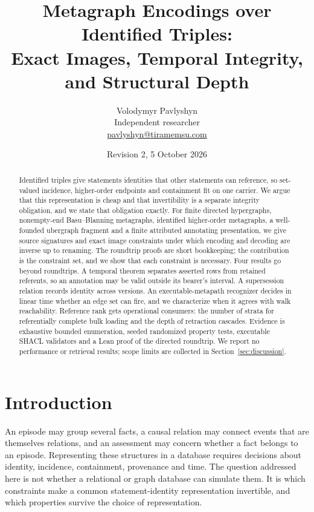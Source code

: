 \documentclass[11pt]{article}
\title{Metagraph Encodings over Identified Triples:\\
Exact Images, Temporal Integrity, and Structural Depth}
\author{Volodymyr Pavlyshyn\\[2pt]\small Independent researcher\\
\small\href{mailto:pavlyshyn@tiramemsu.com}{pavlyshyn@tiramemsu.com}}
\date{Revision 2, 5 October 2026}
\theoremstyle{plain}
\theoremstyle{definition}
\theoremstyle{remark}
\begin{document}
\maketitle
\begin{abstract}
Identified triples give statements identities that other statements can reference,
so set-valued incidence, higher-order endpoints and containment fit on one carrier.
We argue that this representation is cheap and that invertibility is a separate
integrity obligation, and we state that obligation exactly. For finite directed
hypergraphs, nonempty-end Basu--Blanning metagraphs, identified higher-order
metagraphs, a well-founded ubergraph fragment and a finite attributed annotating
presentation, we give source signatures and exact image constraints under which
encoding and decoding are inverse up to renaming. The roundtrip proofs are short
bookkeeping; the contribution is the constraint set, and we show that each constraint
is necessary. Four results go beyond roundtrips. A temporal theorem separates asserted
rows from retained referents, so an annotation may be valid outside its bearer's
interval. A supersession relation records identity across versions. An executable-metapath
recognizer decides in linear time whether an edge set can fire, and we characterize
when it agrees with walk reachability. Reference rank gets operational consumers:
the number of strata for referentially complete bulk loading and the depth of
retraction cascades. Evidence is exhaustive bounded enumeration, seeded randomized
property tests, executable SHACL validators and a Lean proof of the directed roundtrip.
We report no performance or retrieval results; scope limits are collected in
Section~\ref{sec:discussion}.
\end{abstract}

\section{Introduction}\label{sec:intro}
An episode may group several facts, a causal relation may connect events that are
themselves relations, and an assessment may concern whether a fact belongs to an
episode. Representing these structures in a database requires decisions about identity,
incidence, containment, provenance and time. The question addressed here is not
whether a relational or graph database can simulate them. It is which constraints make
a common statement-identity representation invertible, and which properties survive
the choice of representation.
\end{document}
